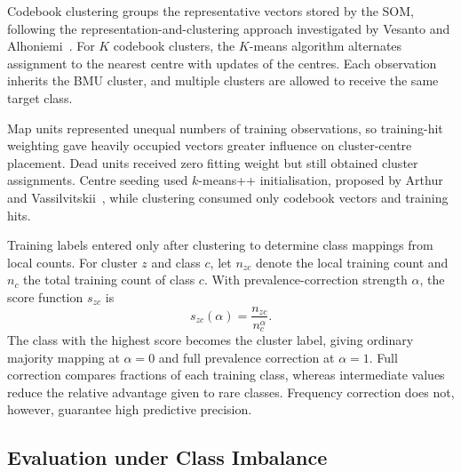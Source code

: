 Codebook clustering groups the representative vectors stored by the SOM, following the representation-and-clustering approach investigated by Vesanto and Alhoniemi~\cite{vesanto2000}. For $K$ codebook clusters, the $K$-means algorithm alternates assignment to the nearest centre with updates of the centres. Each observation inherits the BMU cluster, and multiple clusters are allowed to receive the same target class.

Map units represented unequal numbers of training observations, so training-hit weighting gave heavily occupied vectors greater influence on cluster-centre placement. Dead units received zero fitting weight but still obtained cluster assignments. Centre seeding used $k$-means++ initialisation, proposed by Arthur and Vassilvitskii~\cite{arthur2007}, while clustering consumed only codebook vectors and training hits.

Training labels entered only after clustering to determine class mappings from local counts. For cluster $z$ and class $c$, let $n_{zc}$ denote the local training count and $n_c$ the total training count of class $c$. With prevalence-correction strength $\alpha$, the score function $s_{zc}$ is
\begin{equation}
 s_{zc}(\alpha)=\frac{n_{zc}}{n_c^{\alpha}}.
 \label{eq:mapping}
\end{equation}
The class with the highest score becomes the cluster label, giving ordinary majority mapping at $\alpha=0$ and full prevalence correction at $\alpha=1$. Full correction compares fractions of each training class, whereas intermediate values reduce the relative advantage given to rare classes. Frequency correction does not, however, guarantee high predictive precision.

\subsection{Evaluation under Class Imbalance}

